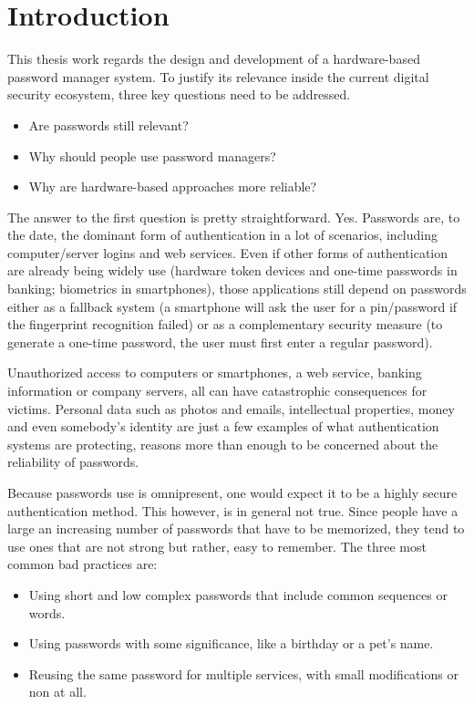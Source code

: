 \chapter{Introduction}

This thesis work regards the design and development of a hardware-based password manager system. To justify its relevance inside the current digital security ecosystem, three key questions need to be addressed. 
\begin{itemize}
\setlength\itemsep{-3pt}
\item Are passwords still relevant?
\item Why should people use password managers?
\item Why are hardware-based approaches more reliable?
\end{itemize}

The answer to the first question is pretty straightforward. Yes. Passwords are, to the date, the dominant form of authentication in a lot of scenarios, including computer/server logins and web services. Even if other forms of authentication are already being widely use (hardware token devices and one-time passwords in banking; biometrics in smartphones), those applications still depend on passwords either as a fallback system (a smartphone will ask the user for a pin/password if the fingerprint recognition failed) or as a complementary security measure (to generate a one-time password, the user must first enter a regular password).

Unauthorized access to computers or smartphones, a web service, banking information or company servers, all can have catastrophic consequences for victims. Personal data such as photos and emails, intellectual properties, money and even somebody’s identity are just a few examples of what authentication systems are protecting, reasons more than enough to be concerned about the reliability of passwords.

\newpage

Because passwords use is omnipresent, one would expect it to be a highly secure authentication method. This however, is in general not true. Since people have a large an increasing number of passwords that have to be memorized, they tend to use ones that are not strong but rather, easy to remember. The three most common bad practices are:
\begin{itemize}
\setlength\itemsep{-3pt}
\item Using short and low complex passwords that include common sequences or words.
\item Using passwords with some significance, like a birthday or a pet's name.
\item Reusing the same password for multiple services, with small modifications or non at all.
\end{itemize}

